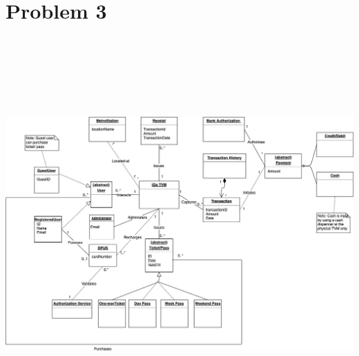 \documentclass[a4paper, 11pt]{report}
\begin{document}
{\chapter{Problem 3}
 \includegraphics[width=180mm,height=150mm,scale=0.5]
{DomainDiagram.jpg}

}
\end{document}
